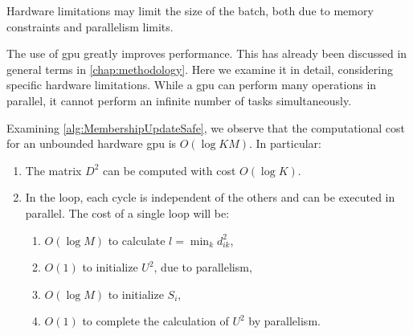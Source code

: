\begin{toReview}
	\bigskip\noindent Hardware limitations may limit the size of the batch, both due to memory constraints and parallelism limits.

	\noindent The use of \gls{gpu} greatly improves performance. This has already been discussed in general terms in \cref{chap:methodology}. Here we examine it in detail, considering specific hardware limitations. While a \gls{gpu} can perform many operations in parallel, it cannot perform an infinite number of tasks simultaneously.

	\bigskip \noindent Examining \cref{alg:MembershipUpdateSafe}, we observe that the computational cost for an unbounded hardware \gls{gpu} is $O(\log KM)$. In particular:
	\begin{enumerate}
		\item The matrix $D^2$ can be computed with cost $O\left(\log K\right)$.
		\item In the loop, each cycle is independent of the others and can be executed in parallel. The cost of a single loop will be:
		\begin{enumerate}
			\item $O\left(\log M\right)$ to calculate $l = \min_k{d_{ik}^2}$,
			\item $O\left(1\right)$ to initialize $U^2$, due to parallelism,
			\item $O\left(\log M\right)$ to initialize $S_i$, \item $O\left(1\right)$ to complete the calculation of $U^2$ by parallelism.
		\end{enumerate}
	\end{enumerate}


\end{toReview}

